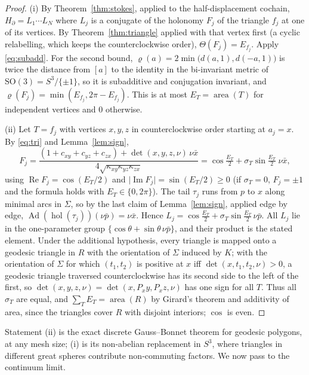 \documentclass[11pt,reqno]{amsart}
\theoremstyle{definition}
\theoremstyle{remark}
\numberwithin{equation}{section}
\newcommand{\Ad}{\operatorname{Ad}}
\newcommand{\re}{\operatorname{Re}}
\newcommand{\im}{\operatorname{Im}}
\newcommand{\SO}{\mathrm{SO}}
\newcommand{\hol}{\operatorname{hol}}
\begin{document}
\begin{proof}
(i) By Theorem~\ref{thm:stokes}, applied to the half-displacement cochain, $H_\partial=L_1\cdots L_N$ where $L_j$ is a
conjugate of the holonomy $F_j$ of the triangle $f_j$ at one of its vertices.  By Theorem~\ref{thm:triangle} applied
with that vertex first (a cyclic relabelling, which keeps the counterclockwise order), $\Theta(F_j)=E_{f_j}$.
Apply \eqref{eq:subadd}.  For the second bound, $\varrho(a)=2\min\bigl(d(a,1),d(-a,1)\bigr)$ is twice the distance from $[a]$ to the
identity in the bi-invariant metric of $\SO(3)=S^3/\{\pm1\}$, so it is subadditive and conjugation invariant, and
$\varrho(F_j)=\min(E_{f_j},2\pi-E_{f_j})$.  This is at most $E_T=\operatorname{area}(T)$ for independent vertices and $0$ otherwise.

(ii) Let $T=f_j$ with vertices $x,y,z$ in counterclockwise order starting at $a_j=x$.  By \eqref{eq:tri} and
Lemma~\ref{lem:sign},
\[
F_j=\frac{(1+c_{xy}+c_{yz}+c_{zx})+\det(x,y,z,\nu)\,\nu\bar x}{4\sqrt{\kappa_{xy}\kappa_{yz}\kappa_{zx}}}
=\cos\tfrac{E_T}2+\sigma_T\sin\tfrac{E_T}2\;\nu\bar x ,
\]
using $\re F_j=\cos(E_T/2)$ and $\lvert\im F_j\rvert=\sin(E_T/2)\ge0$ (if $\sigma_T=0$, $F_j=\pm1$ and the formula holds
with $E_T\in\{0,2\pi\}$).  The tail $\tau_j$ runs from $p$ to $x$ along minimal arcs in $\Sigma$, so by the last claim
of Lemma~\ref{lem:sign}, applied edge by edge, $\Ad(\hol(\tau_j))(\nu\bar p)=\nu\bar x$.  Hence
$L_j=\cos\tfrac{E_T}2+\sigma_T\sin\tfrac{E_T}2\,\nu\bar p$.  All $L_j$ lie in the one-parameter group
$\{\cos\theta+\sin\theta\,\nu\bar p\}$, and their product is the stated element.  Under the additional hypothesis,
every triangle is mapped onto a geodesic triangle in $R$ with the orientation of $\Sigma$ induced by $K$; with the
orientation of $\Sigma$ for which $(t_1,t_2)$ is positive at $x$ iff $\det(x,t_1,t_2,\nu)>0$, a geodesic triangle traversed
counterclockwise has its second side to the left of the first, so $\det(x,y,z,\nu)=\det(x,P_xy,P_xz,\nu)$ has one sign
for all $T$.  Thus all $\sigma_T$ are equal, and $\sum_TE_T=\operatorname{area}(R)$ by Girard's theorem and additivity of
area, since the triangles cover $R$ with disjoint interiors; $\cos$ is even.
\end{proof}

Statement (ii) is the exact discrete Gauss--Bonnet theorem for geodesic polygons, at any mesh size; (i) is its
non-abelian replacement in $S^3$, where triangles in different great spheres contribute non-commuting factors.
We now pass to the continuum limit.
\end{document}
